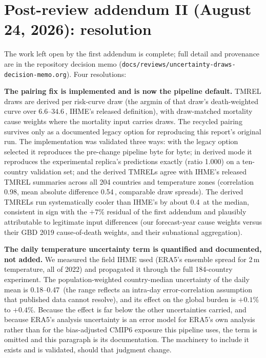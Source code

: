\documentclass[11pt]{ozreport}
\begin{document}
\section{Post-review addendum II (August 24, 2026): resolution}
\label{sec:addendum2}

The work left open by the first addendum is complete; full detail and
provenance are in the repository decision memo
(\texttt{docs/reviews/uncertainty-draws-decision-memo.org}). Four
resolutions:

\textbf{The pairing fix is implemented and is now the pipeline default.}
TMREL draws are derived per risk-curve draw (the argmin of that draw's
death-weighted curve over 6.6--34.6\,\textcelsius{}, IHME's released
definition), with draw-matched mortality cause weights where the mortality
input carries draws. The recycled pairing survives only as a documented
legacy option for reproducing this report's original run. The
implementation was validated three ways: with the legacy option selected it
reproduces the pre-change pipeline byte for byte; in derived mode it
reproduces the experimental replica's predictions exactly (ratio 1.000) on
a ten-country validation set; and the derived TMRELs agree with IHME's
released TMREL summaries across all 204 countries and temperature zones
(correlation 0.98, mean absolute difference 0.54\,\textcelsius{},
comparable draw spreads). The derived TMRELs run systematically cooler
than IHME's by about 0.4\,\textcelsius{} at the median, consistent in
sign with the $+7\%$ residual of the first addendum and plausibly
attributable to legitimate input differences (our forecast-year cause
weights versus their GBD 2019 cause-of-death weights, and their
subnational aggregation).

\textbf{The daily temperature uncertainty term is quantified and
documented, not added.} We measured the field IHME used (ERA5's ensemble
spread for 2\,m temperature, all of 2022) and propagated it through the
full 184-country experiment. The population-weighted country-median
uncertainty of the daily mean is 0.18--0.47\,\textcelsius{} (the range
reflects an intra-day error-correlation assumption that published data
cannot resolve), and its effect on the global burden is $+0.1\%$ to
$+0.4\%$. Because the effect is far below the other uncertainties
carried, and because ERA5's analysis uncertainty is an error model for
ERA5's own analysis rather than for the bias-adjusted CMIP6 exposure this
pipeline uses, the term is omitted and this paragraph is its
documentation. The machinery to include it exists and is validated,
should that judgment change.
\end{document}
